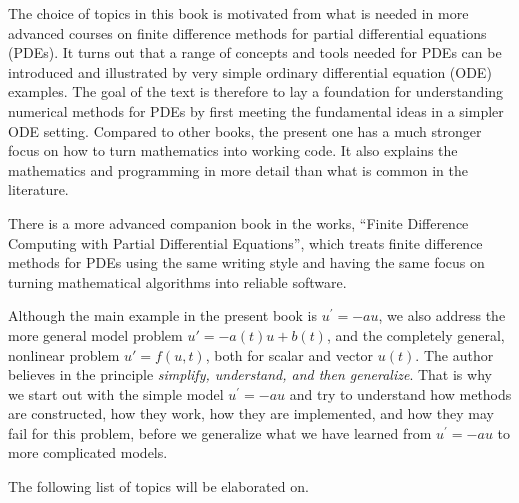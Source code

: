 \documentclass[graybox,sectrefs,envcountresetchap,open=right,final]{svmonodo}
\begin{document}
The choice of topics in this book is motivated from what is needed in
more advanced courses on finite difference methods for partial
differential equations (PDEs).  It turns out that a range of concepts
and tools needed for PDEs can be introduced and illustrated by very
simple ordinary differential equation (ODE) examples. The goal of the
text is therefore to lay a foundation for understanding numerical
methods for PDEs by first meeting the fundamental ideas in a simpler
ODE setting. Compared to other books, the present one has a much
stronger focus on how to turn mathematics into working code.
It also explains the mathematics and programming in more detail
than what is common in the literature.

There is a more advanced companion book in the works, ``Finite
Difference Computing with Partial Differential Equations'', which
treats finite difference methods for PDEs using the same writing style
and having the same focus on turning mathematical algorithms into
reliable software.

Although the main example in the present book is $u^{\prime}=-au$, we
also address the more general model problem $u'=-a(t)u + b(t)$, and
the completely general, nonlinear problem $u'=f(u,t)$, both for scalar
and vector $u(t)$. The author believes in the principle \emph{simplify,
understand, and then generalize}. That is why we start out with the
simple model $u^{\prime}=-au$ and try to understand how methods are
constructed, how they work, how they are implemented, and how they may
fail for this problem, before we generalize what we have learned from
$u^{\prime}=-au$ to more complicated models.

The following list of topics will be elaborated on.
\end{document}
